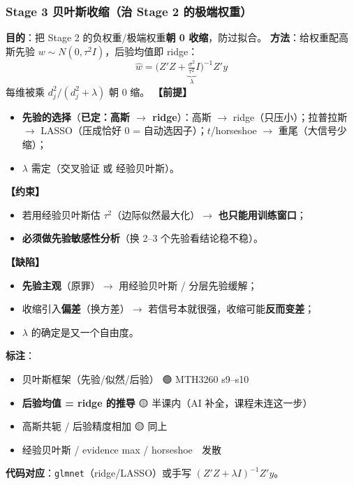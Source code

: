 \documentclass[11pt]{article}
\begin{document}
\subsubsection{\texorpdfstring{Stage 3 \textperiodcentered{} 贝叶斯收缩（治 Stage 2 的极端权重）}{Stage 3 · 贝叶斯收缩（治 Stage 2 的极端权重）}}
\textbf{目的}：把 Stage 2 的负权重/极端权重\textbf{朝 0 收缩}，防过拟合。
\textbf{方法}：给权重配高斯先验 $w\sim N(0,\tau^2 I)$，后验均值即 ridge：
\[
\hat w = \Big(Z'Z + \underbrace{\tfrac{\sigma^2}{\tau^2}}_{\lambda}I\Big)^{-1}Z'y
\]
每维被乘 $d_j^2/(d_j^2+\lambda)$ 朝 0 缩。
\textbf{【前提】}
\begin{itemize}
  \item \textbf{先验的选择}（\textbf{已定：高斯 \ensuremath{\rightarrow} ridge}）：高斯 \ensuremath{\rightarrow} ridge（只压小）；拉普拉斯 \ensuremath{\rightarrow} LASSO（压成恰好 0 = 自动选因子）；$t$/horseshoe \ensuremath{\rightarrow} 重尾（大信号少缩）；
  \item $\lambda$ 需定（交叉验证 或 经验贝叶斯）。
\end{itemize}
\textbf{【约束】}
\begin{itemize}
  \item 若用经验贝叶斯估 $\tau^2$（边际似然最大化）\ensuremath{\rightarrow} \textbf{也只能用训练窗口}；
  \item \textbf{必须做先验敏感性分析}（换 2--3 个先验看结论稳不稳）。
\end{itemize}
\textbf{【缺陷】}
\begin{itemize}
  \item \textbf{先验主观}（原罪）\ensuremath{\rightarrow} 用经验贝叶斯 / 分层先验缓解；
  \item 收缩引入\textbf{偏差}（换方差）\ensuremath{\rightarrow} 若信号本就很强，收缩可能\textbf{反而变差}；
  \item $\lambda$ 的确定是又一个自由度。
\end{itemize}
\textbf{标注}：
\begin{itemize}
  \item 贝叶斯框架（先验/似然/后验） 🟢 MTH3260 s9--s10
  \item \textbf{后验均值 = ridge 的推导} 🟡 半课内（AI 补全，课程未连这一步）
  \item 高斯共轭 / 后验精度相加 🟡 同上
  \item 经验贝叶斯 / evidence max / horseshoe 🔴 发散
\end{itemize}
\textbf{代码对应}：\texttt{glmnet}（ridge/LASSO）或手写 $(Z'Z+\lambda I)^{-1}Z'y$。
\end{document}
